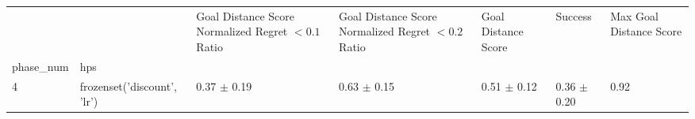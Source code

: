 \begin{tabular}{lllllll}
\toprule
 &  & Goal Distance Score Normalized Regret $< 0.1$ Ratio & Goal Distance Score Normalized Regret $< 0.2$ Ratio & Goal Distance Score & Success & Max Goal Distance Score \\
phase_num & hps &  &  &  &  &  \\
\midrule
4 & frozenset({'discount', 'lr'}) & 0.37 $\pm$ 0.19 & 0.63 $\pm$ 0.15 & 0.51 $\pm$ 0.12 & 0.36 $\pm$ 0.20 & 0.92 \\
\cline{1-7}
\bottomrule
\end{tabular}
